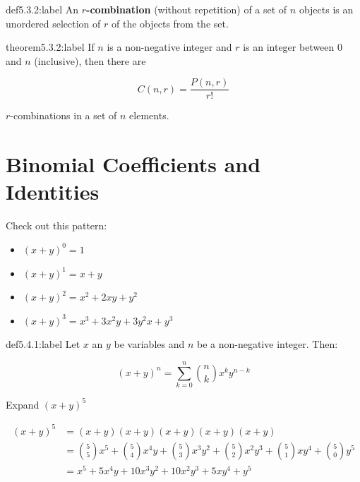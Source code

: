 \begin{definition}{def5.3.2:label}
    An \textbf{$r$-combination} (without repetition) of a set of $n$ objects is an unordered selection of $r$ of the objects from the set.
\end{definition}


\begin{theorem}{theorem5.3.2:label}
    If $n$ is a non-negative integer and $r$ is an integer between 0 and $n$ (inclusive), then there are 
    
    $$
    C(n,r) = \frac{P(n,r)}{r!}
    $$

    $r$-combinations in a set of $n$ elements.
\end{theorem}


\section{Binomial Coefficients and Identities}

Check out this pattern:

\begin{itemize}
    \item $(x+y)^0 = 1$
    \item $(x+y)^1 = x+y$
    \item $(x+y)^2=x^2+2xy+y^2$
    \item $(x+y)^3=x^3+3x^2y+3y^2x+y^3$
\end{itemize}

\begin{theorem}{def5.4.1:label}
    Let $x$ an $y$ be variables and $n$ be a non-negative integer. Then:

    $$
    (x+y)^n = \sum_{k=0}^n \binom{n}{k}x^ky^{n-k}
    $$
\end{theorem}

\begin{problem}
    Expand $(x+y)^5$

    $$
    \begin{aligned}
        (x+y)^5 &= (x+y)(x+y)(x+y)(x+y)(x+y)\\
        &= \binom{5}{5}x^5+\binom{5}{4}x^4y+\binom{5}{3}x^3y^2+\binom{5}{2}x^2y^3+\binom{5}{1}xy^4+\binom{5}{0}y^5\\
        &= x^5+5x^4y+10x^3y^2+10x^2y^3+5xy^4+y^5
    \end{aligned}
    $$
\end{problem}

